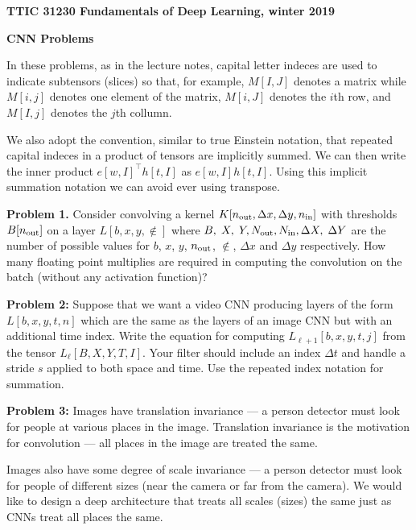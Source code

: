 \documentclass{article}
\newcommand{\solution}[1]{}
\begin{document}
\centerline{\bf TTIC 31230 Fundamentals of Deep Learning, winter 2019}

\medskip
\centerline{\bf CNN Problems}

In these problems, as in the lecture notes, capital letter indeces are used to indicate subtensors (slices) so that, for example,  $M[I,J]$ denotes a matrix
while $M[i,j]$ denotes one element of the matrix, $M[i,J]$ denotes the $i$th row, and $M[I,j]$ denotes the $j$th collumn.

\medskip
We also adopt the convention, similar to true Einstein notation, that repeated capital indeces in a product of tensors are implicitly summed.  We can then write
the inner product $e[w,I]^\top h[t,I]$ as $e[w,I]h[t,I]$.  Using this implicit summation notation we can avoid ever using transpose.

\bigskip
{\bf Problem 1.}  Consider convolving a kernel $K[n_{\mathrm{out}},\Delta x, \Delta y,n_{\mathrm{in}}]$  with thresholds $B[n_{\mathrm{out}}]$ on a layer $L[b,x,y,\nin]$ where $B,\;X,\;Y,N_{\mathrm{out}}, N_{\mathrm{in}},\Delta X,\;\Delta Y$
are the number of possible values for $b$, $x$, $y$, $n_{\mathrm{out}}$, $\nin$, $\Delta x$ and $\Delta y$ respectively.
How many floating point multiplies are required
in computing the convolution on the batch (without any activation function)?

\solution{$$BXY\;\Delta X\;\Delta Y \;\Nout \;\Nin$$}

\bigskip
{\bf Problem 2:} Suppose that we want a video CNN producing layers of the form $L[b,x,y,t,n]$ which are the same as the layers of an image CNN but with an additional time index.
Write the equation for computing $L_{\ell+1}[b,x,y,t,j]$ from the tensor $L_\ell[B,X,Y,T,I]$.  Your filter should include an index $\Delta t$ and handle a stride $s$ applied
to both space and time. Use the repeated index notation for summation.

\solution{
  $$L_{\ell + 1}[b,x,y,t,\nout] = \sigma(K_{\ell+1}[\nout \Delta X, \Delta Y, \Delta T, \Nin] L_\ell[b, sx+ \Delta X, sy + \Delta Y, st + \Delta T, \Nin]- B[\nout])$$
  }

\bigskip
{\bf Problem 3:} Images have translation invariance --- a person detector must look for people at
various places in the image.  Translation invariance is the motivation for convolution --- all
places in the image are treated the same.

\medskip
Images also have some degree of scale invariance --- a person detector must look for people of different sizes
(near the camera or far from the camera).  We would like to design a deep architecture that treats all scales (sizes) the same just as CNNs
treat all places the same.
\end{document}
